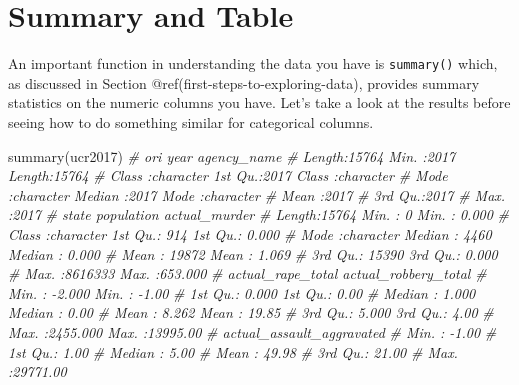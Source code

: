 \documentclass[
  a4paper,
]{krantz}
\makeatletter
\newenvironment{Shaded}{\begin{snugshade}}{\end{snugshade}}
\newcommand{\CommentTok}[1]{\textcolor[rgb]{0.56,0.35,0.01}{\textit{#1}}}
\newcommand{\FunctionTok}[1]{\textcolor[rgb]{0.00,0.00,0.00}{#1}}
\newcommand{\NormalTok}[1]{#1}
\newenvironment{kframe}{%
\medskip{}
\setlength{\fboxsep}{.8em}
 \def\at@end@of@kframe{}%
 \ifinner\ifhmode%
  \def\at@end@of@kframe{\end{minipage}}%
  \begin{minipage}{\columnwidth}%
 \fi\fi%
 \def\FrameCommand##1{\hskip\@totalleftmargin \hskip-\fboxsep
 \colorbox{shadecolor}{##1}\hskip-\fboxsep
     \hskip-\linewidth \hskip-\@totalleftmargin \hskip\columnwidth}%
 \MakeFramed {\advance\hsize-\width
   \@totalleftmargin\z@ \linewidth\hsize
   \@setminipage}}%
 {\par\unskip\endMakeFramed%
 \at@end@of@kframe}
\renewenvironment{Shaded}{\begin{kframe}}{\end{kframe}}
\makeatother
\begin{document}
\hypertarget{summary-and-table}{%
\section{Summary and Table}\label{summary-and-table}}

An important function in understanding the data you have is
\texttt{summary()} which, as discussed in Section
@ref(first-steps-to-exploring-data), provides summary
statistics on the numeric columns you have. Let's take a
look at the results before seeing how to do something
similar for categorical columns.

\begin{Shaded}
\begin{Highlighting}[]
\FunctionTok{summary}\NormalTok{(ucr2017)}
\CommentTok{\#      ori                 year      agency\_name       }
\CommentTok{\#  Length:15764       Min.   :2017   Length:15764      }
\CommentTok{\#  Class :character   1st Qu.:2017   Class :character  }
\CommentTok{\#  Mode  :character   Median :2017   Mode  :character  }
\CommentTok{\#                     Mean   :2017                     }
\CommentTok{\#                     3rd Qu.:2017                     }
\CommentTok{\#                     Max.   :2017                     }
\CommentTok{\#     state             population      actual\_murder    }
\CommentTok{\#  Length:15764       Min.   :      0   Min.   :  0.000  }
\CommentTok{\#  Class :character   1st Qu.:    914   1st Qu.:  0.000  }
\CommentTok{\#  Mode  :character   Median :   4460   Median :  0.000  }
\CommentTok{\#                     Mean   :  19872   Mean   :  1.069  }
\CommentTok{\#                     3rd Qu.:  15390   3rd Qu.:  0.000  }
\CommentTok{\#                     Max.   :8616333   Max.   :653.000  }
\CommentTok{\#  actual\_rape\_total  actual\_robbery\_total}
\CommentTok{\#  Min.   :  {-}2.000   Min.   :   {-}1.00    }
\CommentTok{\#  1st Qu.:   0.000   1st Qu.:    0.00    }
\CommentTok{\#  Median :   1.000   Median :    0.00    }
\CommentTok{\#  Mean   :   8.262   Mean   :   19.85    }
\CommentTok{\#  3rd Qu.:   5.000   3rd Qu.:    4.00    }
\CommentTok{\#  Max.   :2455.000   Max.   :13995.00    }
\CommentTok{\#  actual\_assault\_aggravated}
\CommentTok{\#  Min.   :   {-}1.00         }
\CommentTok{\#  1st Qu.:    1.00         }
\CommentTok{\#  Median :    5.00         }
\CommentTok{\#  Mean   :   49.98         }
\CommentTok{\#  3rd Qu.:   21.00         }
\CommentTok{\#  Max.   :29771.00}
\end{Highlighting}
\end{Shaded}
\end{document}
